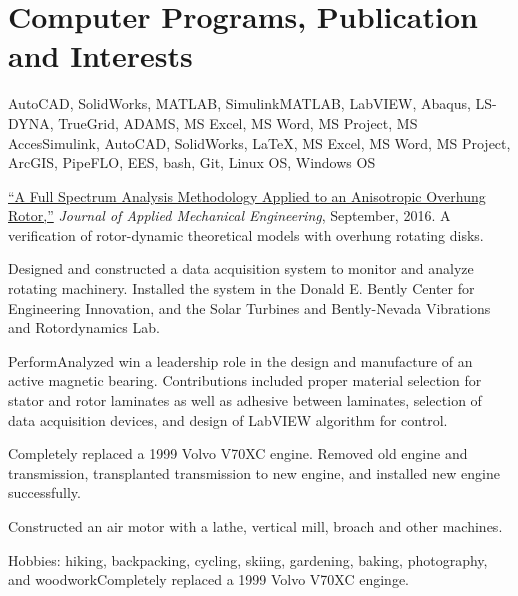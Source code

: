 \documentclass[10pt]{article} %
\begin{document}
\section{Computer Programs, Publication and Interests}
\begin{adjustwidth}{-7pt}{7pt}


	 \footnotesize{AutoCAD, SolidWorks, MATLAB, SimulinkMATLAB, LabVIEW, Abaqus, LS-DYNA, TrueGrid, ADAMS, MS Excel, MS Word, MS Project, MS AccesSimulink, AutoCAD, SolidWorks, {\fb \LaTeX}\setmainfont[SmallCapsFont=Fontin SmallCaps]{Fontin-Regular}, MS Excel, MS Word, MS Project, ArcGIS, PipeFLO, EES, bash, Git, Linux OS, Windows OS}\par
	 \footnotesize{ \href{https://www.omicsgroup.org/journals/a-full-spectrum-analysis-methodology-applied-to-an-anisotropic-overhung-rotor-2168-9873-1000232.php?aid=81544}{``A Full Spectrum Analysis Methodology Applied to an Anisotropic Overhung Rotor,''} \textit{Journal of Applied Mechanical Engineering}, September, 2016. A verification of rotor-dynamic theoretical models with overhung rotating disks.}\par
	 \footnotesize{Designed and constructed a data acquisition system to monitor and analyze rotating machinery. Installed the system in the Donald E. Bently Center for Engineering Innovation, and the Solar Turbines and Bently-Nevada Vibrations and Rotordynamics Lab.}\par
	 \footnotesize{PerformAnalyzed win a leadership role in the design and manufacture of an active magnetic bearing. Contributions included proper material selection for stator and rotor laminates as well as adhesive between laminates, selection of data acquisition devices, and design of LabVIEW algorithm for control.}\par
	 \footnotesize{Completely replaced a 1999 Volvo V70XC engine. Removed old engine and transmission, transplanted transmission to new engine, and installed new engine successfully.}\par
	 \footnotesize{Constructed an air motor with a lathe, vertical mill, broach and other machines.}\par
	 \footnotesize{Hobbies: hiking, backpacking, cycling, skiing, gardening, baking, photography, and woodworkCompletely replaced a 1999 Volvo V70XC enginge.}\par





\end{adjustwidth}
\end{document}
